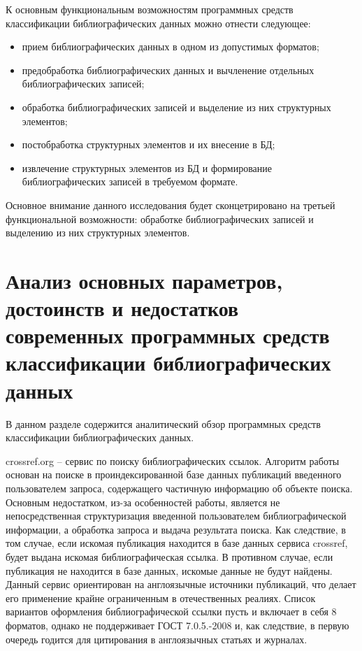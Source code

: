 К основным функциональным возможностям программных средств классификации библиографических данных можно отнести следующее:
\begin{itemize}
	\item прием библиографических данных в одном из допустимых форматов;
	\item предобработка библиографических данных и вычленение отдельных библиографических записей;
	\item обработка библиографических записей и выделение из них структурных элементов;
	\item постобработка структурных элементов и их внесение в БД;
	\item извлечение структурных элементов из БД и формирование библиографических записей в требуемом формате.
\end{itemize}

Основное внимание данного исследования будет сконцетрировано на третьей функциональной возможности: обработке библиографических записей и выделению из них структурных элементов.

\section{Анализ основных параметров, достоинств и недостатков современных программных средств классификации библиографических данных}

В данном разделе содержится аналитический обзор программных средств классификации библиографических данных.

crossref.org -- сервис по поиску библиографических ссылок. Алгоритм работы основан на поиске в проиндексированной базе данных публикаций введенного пользователем запроса, содержащего частичную информацию об объекте поиска. Основным недостатком, из-за особенностей работы, является не непосредственная структуризация введенной пользователем библиографической информации, а обработка запроса и выдача результата поиска. Как следствие, в том случае, если искомая публикация находится в базе данных сервиса crossref, будет выдана искомая библиографическая ссылка. В противном случае, если публикация не находится в базе данных, искомые данные не будут найдены. Данный сервис ориентирован на англоязычные источники публикаций, что делает его применение крайне ограниченным в отечественных реалиях. Список вариантов оформления библиографической ссылки пусть и включает в себя 8 форматов, однако не поддерживает ГОСТ 7.0.5.-2008 и, как следствие, в первую очередь годится для цитирования в англоязычных статьях и журналах.

